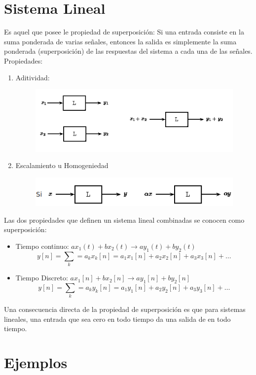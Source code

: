 \documentclass{article}
\author{Jorge Gómez Reus}
\date{}
\begin{document}
\maketitle
\tableofcontents
\section{Sistema Lineal}
Es aquel que posee le propiedad de superposición: Si una entrada consiste en la suma ponderada de varias señales, entonces la salida es simplemente la suma ponderada (superposición) de las respuestas del sistema a cada una de las señales.\\
Propiedades: 
\begin{enumerate}
	\item Aditividad:\\
	\begin{figure}[h!]
		\centering
		\includegraphics[scale=.8]{img/aditivity}
	\end{figure} 
	\item Escalamiento u Homogeniedad
	\begin{figure}[h!]
		\centering
		\includegraphics[scale=.8]{img/proportionality}
	\end{figure} 
\end{enumerate}
Las dos propiedades que definen un sistema lineal combinadas se conocen como superposición:
\begin{itemize}
	\item Tiempo continuo: $ax_1(t) + bx_2(t) \rightarrow ay_1(t) + by_2(t)$\\
	$$y[n] = \sum_{k}=a_{k}x_{k}[n] = a_1x_1[n] + a_2x_2[n] + a_3x_3[n] + \ldots$$
	\item Tiempo Discreto: $ax_1[n] + bx_2[n] \rightarrow ay_1[n] + by_2[n]$\\
	$$y[n] = \sum_{k}=a_{k}y_{k}[n] = a_1y_1[n] + a_2y_2[n] + a_3y_3[n] + \ldots$$
\end{itemize}
Una consecuencia directa de la propiedad de superposición es que para sistemas lineales, una entrada que sea cero en todo tiempo da una salida de en todo tiempo.
\section{Ejemplos}
\end{document}
